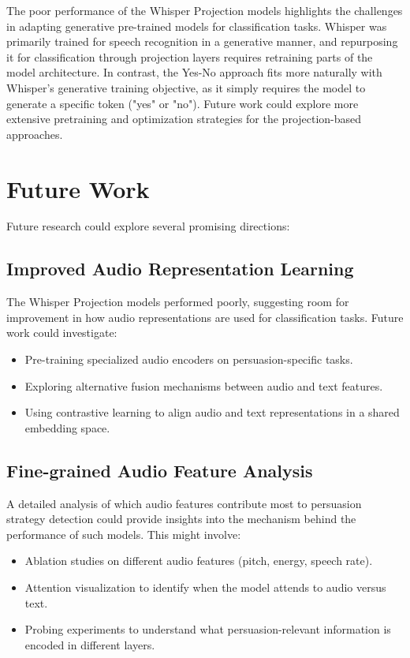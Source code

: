 \documentclass{article}
\begin{document}
The poor performance of the Whisper Projection models highlights the challenges in adapting generative pre-trained models for classification tasks. Whisper was primarily trained for speech recognition in a generative manner, and repurposing it for classification through projection layers requires retraining parts of the model architecture. In contrast, the Yes-No approach fits more naturally with Whisper's generative training objective, as it simply requires the model to generate a specific token ("yes" or "no"). Future work could explore more extensive pretraining and optimization strategies for the projection-based approaches.

\section{Future Work}
Future research could explore several promising directions:

\subsection{Improved Audio Representation Learning}
The Whisper Projection models performed poorly, suggesting room for improvement in how audio representations are used for classification tasks. Future work could investigate:
\begin{itemize}
    \item Pre-training specialized audio encoders on persuasion-specific tasks.
    \item Exploring alternative fusion mechanisms between audio and text features.
    \item Using contrastive learning to align audio and text representations in a shared embedding space.
\end{itemize}

\subsection{Fine-grained Audio Feature Analysis}
A detailed analysis of which audio features contribute most to persuasion strategy detection could provide insights into the mechanism behind the performance of such models. This might involve:
\begin{itemize}
    \item Ablation studies on different audio features (pitch, energy, speech rate).
    \item Attention visualization to identify when the model attends to audio versus text.
    \item Probing experiments to understand what persuasion-relevant information is encoded in different layers.
\end{itemize}
\end{document}
